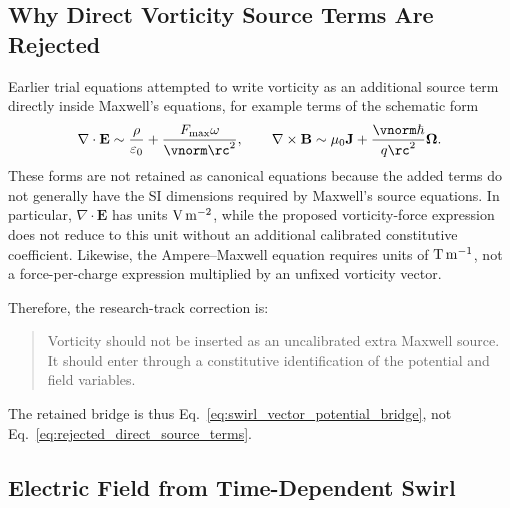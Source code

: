 \subsection{Why Direct Vorticity Source Terms Are Rejected}
    
    Earlier trial equations attempted to write vorticity as an additional
    source term directly inside Maxwell's equations, for example terms of the
    schematic form
    \begin{equation}
        \nabla\cdot\mathbf{E}
        \sim
        \frac{\rho}{\varepsilon_0}
        +
        \frac{F_{\max}\omega}{\vnorm \rc^2},
        \qquad
        \nabla\times\mathbf{B}
        \sim
        \mu_0\mathbf{J}
        +
        \frac{\vnorm\hbar}{q\rc^2}\boldsymbol{\Omega}.
        \label{eq:rejected_direct_source_terms}
    \end{equation}
    These forms are not retained as canonical equations because the added
    terms do not generally have the SI dimensions required by Maxwell's
    source equations.  In particular,
    \(\nabla\cdot\mathbf{E}\) has units
    \({\rm V\,m^{-2}}\), while the proposed vorticity-force expression does
    not reduce to this unit without an additional calibrated constitutive
    coefficient.  Likewise, the Ampere--Maxwell equation requires units of
    \({\rm T\,m^{-1}}\), not a force-per-charge expression multiplied by an
    unfixed vorticity vector.
    
    Therefore, the research-track correction is:
    
    \begin{quote}
        Vorticity should not be inserted as an uncalibrated extra Maxwell source.
        It should enter through a constitutive identification of the potential and
        field variables.
    \end{quote}
    
    The retained bridge is thus Eq.~\eqref{eq:swirl_vector_potential_bridge},
    not Eq.~\eqref{eq:rejected_direct_source_terms}.

\subsection{Electric Field from Time-Dependent Swirl}
    
